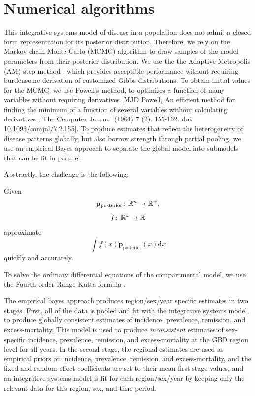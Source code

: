 \documentclass[12pt]{article}
\newcommand{\cc}{\colon\thinspace}
\newcommand{\1}{\mathbf{1}}
\newcommand{\0}{\mathbf{0}}
\newcommand{\bbR}{\mathbb{R}}
\newcommand{\dens}{\mathbf{p}}
\renewcommand{\d}{\mathbf{d}}
\begin{document}
\section{Numerical algorithms}
\label{na}
This integrative systems model of disease in a population does not
admit a closed form representation for its posterior distribution.
Therefore, we rely on the Markov chain Monte Carlo (MCMC) algorithm to
draw samples of the model parameters from their posterior
distribution.  We use the the Adaptive Metropolis (AM) step method
\cite{Haario_Adaptive_2001}, which provides acceptible performance
without requiring burdensome derivation of customized Gibbs
distributions. To obtain initial values for the MCMC, we use Powell's
method, to optimizes a function of many variables without requiring
derivatives \ref{MJD Powell, An efficient method for finding the
  minimum of a function of several variables without calculating
  derivatives , The Computer Journal (1964) 7 (2): 155-162.  doi:
  10.1093/comjnl/7.2.155}.  To produce estimates that reflect the
heterogeneity of disease patterns globally, but also borrow strength
through partial pooling, we use an empirical Bayes approach to
separate the global model into submodels that can be fit in parallel.

Abstractly, the challenge is the following:


Given
\[
\dens_\text{posterior} \cc \bbR^n\rightarrow \bbR^+,
\]
\[
f \cc \bbR^n \rightarrow \bbR
\]
approximate
\[
\int f(x)\dens_\text{posterior}(x)\d x
\]
quickly and accurately.


To solve the ordinary differential equations of the compartmental
model, we use the Fourth order Runge-Kutta formula \cite{Numerical
  Recipes in Fortran 2nd ed.}.

The empirical bayes approach produces region/sex/year specific
estimates in two stages.  First, all of the data is pooled and fit
with the integrative systems model, to produce globally consistent
estimates of incidence, prevalence, remission, and excess-mortality.
This model is used to produce \emph{inconsistent} estimates of
sex-specific incidence, prevalence, remission, and excess-mortality at
the GBD region level for all years.  In the second stage, the regional
estimates are used as empirical priors on incidence, prevalence,
remission, and excess-mortality, and the fixed and random effect
coefficients are set to their mean first-stage values, and an
integrative systems model is fit for each region/sex/year by keeping
only the relevant data for this region, sex, and time period.



\end{document}
